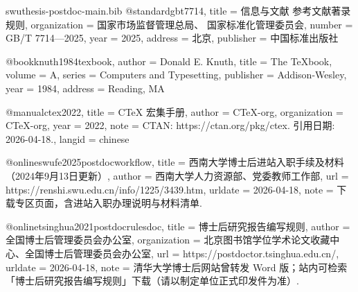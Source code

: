 

\begin{filecontents*}[overwrite]{swuthesis-postdoc-main.bib}
@standard{gbt7714,
  title        = {信息与文献 参考文献著录规则},
  organization = {国家市场监督管理总局、
    国家标准化管理委员会},
  number       = {GB/T 7714---2025},
  year         = {2025},
  address      = {北京},
  publisher    = {中国标准出版社}
}

@book{knuth1984texbook,
  author    = {Donald E. Knuth},
  title     = {The {\TeX}book},
  volume    = {A},
  series    = {Computers and Typesetting},
  publisher = {Addison-Wesley},
  year      = {1984},
  address   = {Reading, MA}
}

@manual{ctex2022,
  title        = {{CTeX} 宏集手册},
  author       = {{CTeX-org}},
  organization = {CTeX-org},
  year         = {2022},
  note         = {CTAN: https://ctan.org/pkg/ctex. 引用日期: 2026-04-18.},
  langid       = {chinese}
}

@online{swufe2025postdocworkflow,
  title        = {西南大学博士后进站入职手续及材料（2024年9月13日更新）},
  author       = {{西南大学人力资源部、党委教师工作部}},
  url          = {https://renshi.swu.edu.cn/info/1225/3439.htm},
  urldate      = {2026-04-18},
  note         = {下载专区页面，含进站入职办理说明与材料清单.}
}

@online{tsinghua2021postdocrulesdoc,
  title        = {博士后研究报告编写规则},
  author       = {{全国博士后管理委员会办公室}},
  organization = {北京图书馆学位学术论文收藏中心、全国博士后管理委员会办公室},
  url          = {https://postdoctor.tsinghua.edu.cn/},
  urldate      = {2026-04-18},
  note         = {清华大学博士后网站曾转发 Word 版；站内可检索「博士后研究报告编写规则」下载（请以制定单位正式印发件为准）.}
}
\end{filecontents*}

\documentclass[postdoc,punct=banjiao]{swuthesis}

\usepackage{subcaption}
\usepackage{mwe}
\usepackage{listings}
\usepackage{enumitem}

